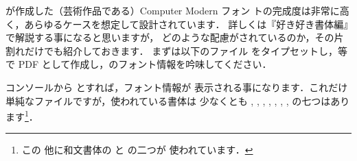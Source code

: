 \begin{Trick}
が作成した（芸術作品である）Computer Modern フォン
トの完成度は非常に高く，あらゆるケースを想定して設計されています．
詳しくは『好き好き\LaTeXe 書体編』で解説する事になると思いますが，
どのような配慮がされているのか，その片割れだけでも紹介しておきます．
まずは以下のファイル  をタイプセットし，\Dvipdfmx 等で
 PDF として作成し，のフォント情報を吟味してください．


コンソールから とすれば，フォント情報が
表示される事になります．これだけ単純なファイルですが，使われている書体は
少なくとも , , , , , 
, ,  の七つはあります\footnote{この
他に和文書体の  と の二つが
使われています．}．



\end{Trick}

